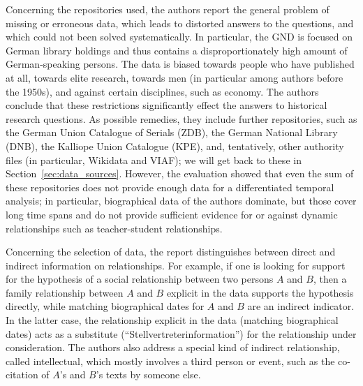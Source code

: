 Concerning the repositories used,
the authors report the general problem of missing or erroneous data,
which leads to distorted answers to the questions, and which could not been solved
systematically. In particular, the GND is focused on German library holdings
and thus contains a disproportionately high amount of German-speaking persons.
The data is biased towards people who have published at all,
towards elite research, towards men (in particular among authors before the 1950s),
and against certain disciplines, such as economy.
The authors conclude that these restrictions significantly effect the answers to
historical research questions. As possible remedies, they include 
further repositories, such as 
the German Union Catalogue of Serials (ZDB),
the German National Library (DNB),
the Kalliope Union Catalogue (KPE),
and, tentatively, other authority files (in particular, Wikidata and VIAF);
we will get back to these in Section~\ref{sec:data_sources}.
However, the evaluation showed that even the sum of these repositories
does not provide enough data for a differentiated temporal
analysis; in particular, biographical data of the authors 
dominate, but those cover long time spans and do not provide sufficient evidence
for or against dynamic relationships such as teacher-student relationships.


Concerning the selection of data, the report distinguishes between
direct and indirect information on relationships.
For example, if one is looking for support for the hypothesis of a social relationship
between two persons $A$ and $B$, then a family relationship between $A$ and $B$ explicit in the data
supports the hypothesis directly, while matching biographical dates for $A$ and $B$
are an indirect indicator. In the latter case, the relationship
explicit in the data (matching biographical dates) acts as a substitute
(\enquote{Stellvertreterinformation}) for the relationship under consideration.
The authors also address a special kind of indirect relationship,
called intellectual, which mostly involves a third person
or event, such as the co-citation of $A$'s and $B$'s texts by someone else.

